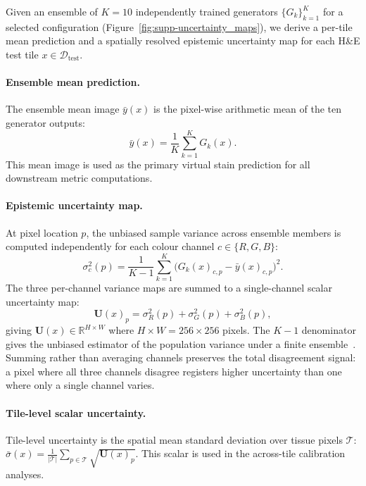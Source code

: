 Given an ensemble of $K{=}10$ independently trained generators $\{G_k\}_{k=1}^{K}$
for a selected configuration (Figure~\ref{fig:supp-uncertainty_maps}), we derive a
per-tile mean prediction and a spatially resolved epistemic uncertainty map for each
H\&E test tile $x \in \mathcal{D}_{\mathrm{test}}$.

\paragraph{Ensemble mean prediction.}
The ensemble mean image $\bar{y}(x)$ is the pixel-wise arithmetic mean of the ten
generator outputs:
\begin{equation}
  \bar{y}(x) = \frac{1}{K} \sum_{k=1}^{K} G_k(x).
\end{equation}
This mean image is used as the primary virtual stain prediction for all downstream
metric computations.

\paragraph{Epistemic uncertainty map.}
At pixel location $p$, the unbiased sample variance across ensemble members is
computed independently for each colour channel $c \in \{R,G,B\}$:
\begin{equation}
  \sigma^2_c(p) = \frac{1}{K-1} \sum_{k=1}^{K}
    \bigl(G_k(x)_{c, p} - \bar{y}(x)_{c, p}\bigr)^2.
\end{equation}
The three per-channel variance maps are summed to a single-channel scalar
uncertainty map:
\begin{equation}
  \mathbf{U}(x)_p = \sigma^2_R(p) + \sigma^2_G(p) + \sigma^2_B(p),
\end{equation}
giving $\mathbf{U}(x) \in \mathbb{R}^{H \times W}$ where $H{\times}W{=}256{\times}256$
pixels.
The $K{-}1$ denominator gives the unbiased estimator of the population variance under
a finite ensemble~\cite{lakshminarayanan2017simple}.
Summing rather than averaging channels preserves the total disagreement signal: a
pixel where all three channels disagree registers higher uncertainty than one where
only a single channel varies.

\paragraph{Tile-level scalar uncertainty.}
Tile-level uncertainty is the spatial mean standard deviation over tissue pixels
$\mathcal{T}$:
$\bar{\sigma}(x) = \frac{1}{|\mathcal{T}|}\sum_{p \in \mathcal{T}} \sqrt{\mathbf{U}(x)_p}$.
This scalar is used in the across-tile calibration analyses.

